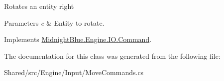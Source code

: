 Rotates an entity right 


\begin{DoxyParams}{Parameters}
{\em e} & Entity to rotate.\\
\hline
\end{DoxyParams}


Implements \hyperlink{class_midnight_blue_1_1_engine_1_1_i_o_1_1_command_ae641d2c1a9db17f03ee6b7854b00a9d2}{Midnight\+Blue.\+Engine.\+I\+O.\+Command}.



The documentation for this class was generated from the following file\+:\begin{DoxyCompactItemize}
\item 
Shared/src/\+Engine/\+Input/Move\+Commands.\+cs\end{DoxyCompactItemize}
